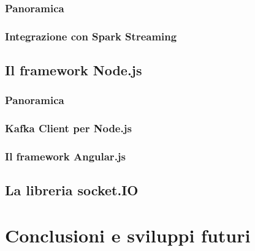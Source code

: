 \documentclass[11pt]{article}
\begin{document}
\subsubsection{Panoramica}
\subsubsection{Integrazione con Spark Streaming}

\subsection{Il framework Node.js}
\subsubsection{Panoramica}
\subsubsection{Kafka Client per Node.js}
\subsubsection{Il framework Angular.js}
\subsection{La libreria socket.IO}

\section{Conclusioni e sviluppi futuri}

\clearpage
{}
\nocite{*}


\end{document}
